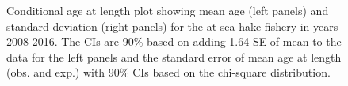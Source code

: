 \documentclass[
]{scrartcl}
\begin{document}
\begin{figure}[H]


\caption{\label{fig-call-plot-ashop1}Conditional age at length plot
showing mean age (left panels) and standard deviation (right panels) for
the at-sea-hake fishery in years 2008-2016. The CIs are 90\% based on
adding 1.64 SE of mean to the data for the left panels and the standard
error of mean age at length (obs. and exp.) with 90\% CIs based on the
chi-square distribution.}

\end{figure}%
\end{document}
